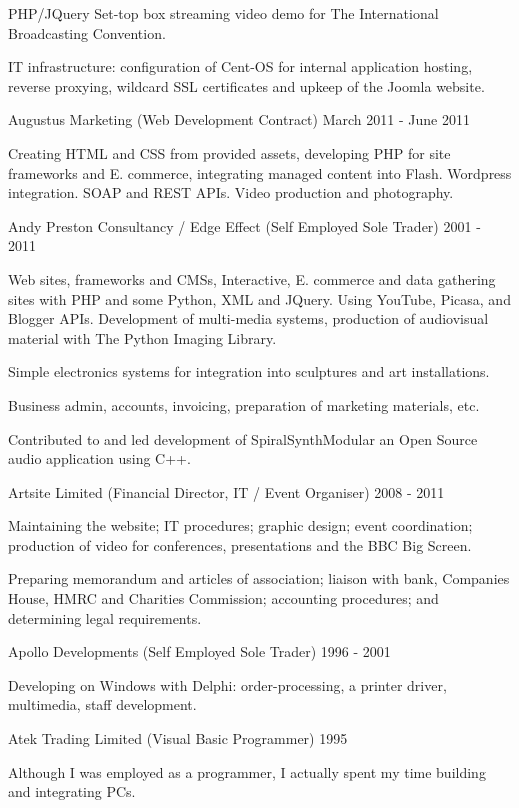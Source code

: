 PHP/JQuery Set-top box streaming video demo for
The International Broadcasting Convention.

IT infrastructure:
configuration of Cent-OS for internal application hosting,
reverse proxying, wildcard SSL certificates
and upkeep of the Joomla website.

\jobHeading
    {Augustus Marketing (Web Development Contract)}
    {March 2011 - June 2011}

Creating HTML and CSS from provided assets,
developing PHP for site frameworks and E. commerce,
integrating managed content into Flash.
Wordpress integration.
SOAP and REST APIs.
Video production and photography.

\jobHeading
    {Andy Preston Consultancy / Edge Effect (Self Employed Sole Trader)}
    {2001 - 2011}

Web sites, frameworks and CMSs, Interactive, E. commerce and
data gathering sites with PHP and some Python, XML and JQuery.
Using YouTube, Picasa, and Blogger APIs.
Development of multi-media systems, production of audiovisual
material with The Python Imaging Library.

Simple electronics systems for integration into
sculptures and art installations.

Business admin, accounts, invoicing, preparation of
marketing materials, etc.

Contributed to and led development
of SpiralSynthModular an Open Source audio application using C++.

\jobHeading
    {Artsite Limited (Financial Director, IT / Event Organiser)}
    {2008 - 2011}

Maintaining the website; IT procedures; graphic design; event coordination;
production of video for conferences, presentations and the BBC Big Screen.

Preparing memorandum and articles of association;
liaison with bank, Companies House, HMRC and Charities Commission;
accounting procedures; and determining legal requirements.

\jobHeading
    {Apollo Developments (Self Employed Sole Trader)}
    {1996 - 2001}

Developing on Windows with Delphi:
order-processing, a printer driver, multimedia, staff development.

\jobHeading
    {Atek Trading Limited (Visual Basic Programmer)}
    {1995}

Although I was employed as a programmer,
I actually spent my time building and integrating PCs.

